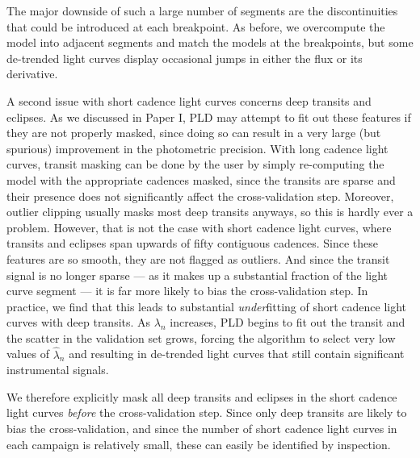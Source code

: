 \documentclass[]{emulateapj}
\begin{document}
The major downside of such a large number of segments are the discontinuities that could
be introduced at each breakpoint. As before, we overcompute the model into adjacent
segments and match the models at the breakpoints, but some de-trended light curves display
occasional jumps in either the flux or its derivative.

A second issue with short cadence light curves concerns deep transits and eclipses. As
we discussed in Paper I, PLD may attempt to fit out these features if they are not
properly masked, since doing so can result in a very large (but spurious) improvement in the
photometric precision.
With long cadence light curves, transit masking can be done by the user by simply re-computing
the model with the appropriate cadences masked, since the transits are sparse and their
presence does not significantly affect the cross-validation step. Moreover, outlier clipping
usually masks most deep transits anyways, so this is hardly ever a problem.
However, that is not the case with short cadence light curves, where transits and eclipses 
span upwards of fifty contiguous cadences. Since these features are so smooth, they are
not flagged as outliers. And since the transit signal is no longer sparse --- as it makes
up a substantial fraction of the light curve segment --- it is far more likely to bias
the cross-validation step. In practice, we find that this leads to substantial 
\emph{under}fitting of short cadence light curves with deep transits. As $\lambda_n$
increases, PLD begins to fit out the transit and the scatter in the validation set
grows, forcing the algorithm to select very low values of $\hat{\lambda}_n$ and resulting
in de-trended light curves that still contain significant instrumental signals.

We therefore explicitly mask all deep transits and eclipses in the short cadence light
curves \emph{before} the cross-validation step. Since only deep transits are likely to
bias the cross-validation, and since the number of short cadence light curves in each
campaign is relatively small, these can easily be identified by inspection.
\end{document}
